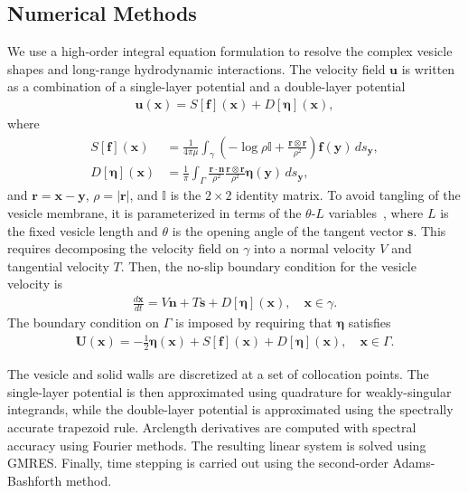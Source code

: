 \documentclass[twoside,twocolumn,9pt]{article}
\newcommand{\ff}{\mathbf{f}}
\newcommand{\eeta}{\boldsymbol{\eta}}
\newcommand{\nn}{\mathbf{n}}
\newcommand{\rr}{\mathbf{r}}
\renewcommand{\ss}{\mathbf{s}}
\newcommand{\uu}{\mathbf{u}}
\newcommand{\UU}{\mathbf{U}}
\newcommand{\xx}{\mathbf{x}}
\newcommand{\yy}{\mathbf{y}}
\begin{document}
\subsection{\label{sec:NumericalMethods}Numerical Methods}
We use a high-order integral equation formulation to resolve the complex
vesicle shapes and long-range hydrodynamic interactions. The velocity
field $\uu$ is written as a combination of a single-layer potential and
a double-layer potential
\begin{align}
  \label{eqn:LPrep}
  \uu(\xx) = S[\ff](\xx) + D[\eeta](\xx),
\end{align}
where
\begin{align}
  S[\ff](\xx) &= \frac{1}{4\pi\mu} \int_{\gamma} \left(
    -\log \rho \mathds{I} + \frac{\rr \otimes \rr}{\rho^2} \right)
    \ff(\yy) \, ds_\yy, \\
%
    D[\eeta](\xx) &= \frac{1}{\pi} \int_{\Gamma} 
      \frac{\rr \cdot \nn}{\rho^2} 
      \frac{\rr \otimes \rr}{\rho^2} \eeta(\yy) \, ds_\yy,
\end{align}
and $\rr = \xx - \yy$, $\rho = |\rr|$, and $\mathds{I}$ is the $2 \times
2$ identity matrix. To avoid tangling of the vesicle membrane, it is
parameterized in terms of the $\theta$-$L$
variables~\cite{hou-low-she1994}, where $L$ is the fixed vesicle length
and $\theta$ is the opening angle of the tangent vector $\ss$. This
requires decomposing the velocity field on $\gamma$ into a normal
velocity $V$ and tangential velocity $T$. Then, the no-slip boundary
condition for the vesicle velocity is
\begin{align}
  \frac{d\xx}{dt} = V \nn + T \ss + D[\eeta](\xx), \quad \xx \in \gamma.
\end{align}
The boundary condition on $\Gamma$ is imposed by requiring that $\eeta$
satisfies
\begin{align}
  \UU(\xx) = -\frac{1}{2}\eeta(\xx) + 
    S[\ff](\xx) + D[\eeta](\xx), \quad \xx \in \Gamma.
  \label{eqn:DLP_BIE}
\end{align}

The vesicle and solid walls are discretized at a set of collocation
points. The single-layer potential is then approximated using quadrature
for weakly-singular integrands, while the double-layer potential is
approximated using the spectrally accurate trapezoid rule. Arclength
derivatives are computed with spectral accuracy using Fourier methods.
The resulting linear system is solved using GMRES. Finally, time
stepping is carried out using the second-order Adams-Bashforth method. 
\end{document}
